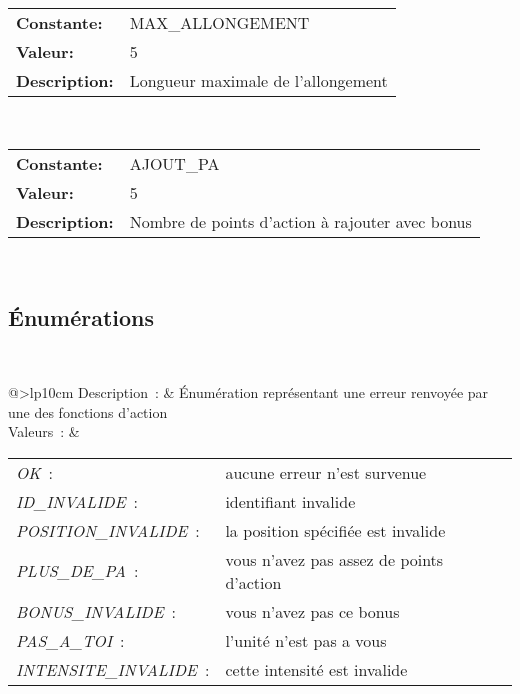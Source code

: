 \noindent \begin{tabular}{lp{15cm}}
\textbf{Constante:} & MAX\_ALLONGEMENT \\
\textbf{Valeur:} & 5 \\
\textbf{Description:} & Longueur maximale de l'allongement \\
\end{tabular} 
\vspace{0.2cm} \\



\noindent \begin{tabular}{lp{15cm}}
\textbf{Constante:} & AJOUT\_PA \\
\textbf{Valeur:} & 5 \\
\textbf{Description:} & Nombre de points d'action à rajouter avec bonus \\
\end{tabular} 
\vspace{0.2cm} \\



\subsection{Énumérations}

 \\
\noindent
\begin{tabular}[t]{@{\extracolsep{0pt}}>{\bfseries}lp{10cm}}
Description~: & Énumération représentant une erreur renvoyée par une des fonctions d'action \\
Valeurs~: &
\small
\begin{tabular}[t]{@{\extracolsep{0pt}}lp{7cm}}
    
        \textsl{OK}~: & aucune erreur n'est survenue \\
    
        \textsl{ID\_INVALIDE}~: & identifiant invalide \\
    
        \textsl{POSITION\_INVALIDE}~: & la position spécifiée est invalide \\
    
        \textsl{PLUS\_DE\_PA}~: & vous n'avez pas assez de points d'action \\
    
        \textsl{BONUS\_INVALIDE}~: & vous n'avez pas ce bonus \\
    
        \textsl{PAS\_A\_TOI}~: & l'unité n'est pas a vous \\
    
        \textsl{INTENSITE\_INVALIDE}~: & cette intensité est invalide \\
    
\end{tabular} \\
\end{tabular}



